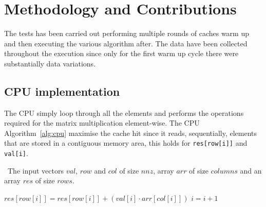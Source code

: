 \documentclass[conference]{IEEEtran}
\begin{document}
\section{Methodology and Contributions}\label{sec:methodology}


The tests has been carried out performing multiple rounds of caches warm up and then executing the various algorithm after. The data have been collected throughout the execution since only for the first warm up cycle there were substantially data variations.

\subsection{CPU implementation}



The CPU simply loop through all the elements and performs the operations required for the matrix multiplication element-wise. The CPU Algorithm~\ref{alg:cpu} maximise the cache hit since it reads, sequentially, elements that are stored in a contiguous memory area, this holds for \texttt{res[row[i]]} and \texttt{val[i]}.

\begin{algorithm}[h]
\caption{SpMV algorithm on CPU}
\algorithmicrequire~The input vectors \(val\), \(row\) and \(col\) of size \(nnz\), array \(arr\) of size \(columns\) and an array \(res\) of size \(rows\).
\begin{algorithmic}[1]
    \State\(res[row[i]] = res[row[i]] + (val[i] \cdot arr[col[i]])\)
    \State\(i = i + 1\)
  \EndWhile%
\EndProcedure%
\end{algorithmic}
\label{alg:cpu}
\end{algorithm}
\end{document}
